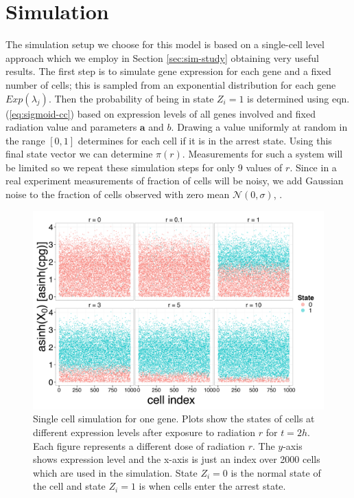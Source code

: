 \section{Simulation}
\label{sec:simulation}

The simulation setup we choose for this model is based on a single-cell level approach which we employ in Section \ref{sec:sim-study} obtaining very useful results. The first step is to simulate gene expression for each gene and a fixed number of cells; this is sampled from an exponential distribution for each gene $Exp(\lambda_j)$. Then the probability of being in state $Z_i = 1$  is determined using eqn. (\ref{eq:sigmoid-cc}) based on expression levels of all genes involved and fixed radiation value and parameters  $\mathbf{a}$ and $b$. Drawing a value uniformly at random in the range $[0, 1]$ determines for each cell if it is in the arrest state. Using this final state vector we can determine $\pi(r)$. Measurements for such a system will be limited so we repeat these simulation steps for only $9$ values of $r$. Since in a real experiment measurements of fraction of cells will be noisy, we add Gaussian noise to the fraction of cells observed with zero mean $\mathcal{N}(0, \sigma)$, .

\begin{figure}[!t]
  \centering
  \includegraphics[width=1\textwidth]{pics/cell-cycle-sim1.png}
  \caption{Single cell simulation for one gene. Plots show the states of cells at different expression levels after exposure to radiation $r$ for $t=2h$. Each figure represents a different dose of radiation $r$. The $y$-axis shows expression level and the x-axis is just an index over 2000 cells which are used in the simulation. State $Z_i = 0$ is the normal state of the cell and state $Z_i =1$ is when cells enter the arrest state. }
  \label{fig:rad-single-gene}
\end{figure}

